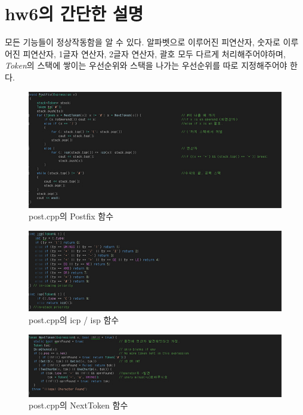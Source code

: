 \documentclass[a4paper,12pt]{article}
\begin{document}
    
    \section{hw6의 간단한 설명}
    모든 기능들이 정상작동함을 알 수 있다. 알파벳으로 이루어진 피연산자, 숫자로 이루어진 피연산자, 1글자 연산자, 2글자 연산자, 괄호 모두 다르게 처리해주어야하며, \textsl{Token}의 스택에 쌓이는 우선순위와 스택을 나가는 우선순위를 따로 지정해주어야 한다.

    
    \newpage
    \begin{figure}[t]\vspace*{4pt} 
    \centerline{\includegraphics[width=1.0\columnwidth]{f1}} 
    \caption{post.cpp의 Postfix 함수}\vspace*{-6pt} 
    \label{figure:f1} 
    \end{figure} 
    
    \begin{figure}[t]\vspace*{4pt} 
    \centerline{\includegraphics[width=1.0\columnwidth]{f2}} 
    \caption{post.cpp의 icp / isp 함수}\vspace*{-6pt} 
    \label{figure:f2} 
    \end{figure} 
    
    \newpage
    \begin{figure}[t]\vspace*{4pt} 
    \centerline{\includegraphics[width=1.0\columnwidth]{f3}} 
    \caption{post.cpp의 NextToken 함수}\vspace*{-6pt} 
    \label{figure:f3} 
    \end{figure} 
    
\end{document}
